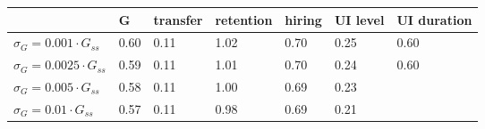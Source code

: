 \begin{tabular}{lllllll}
\toprule
 & \textbf{G} & \textbf{transfer} & \textbf{retention} & \textbf{hiring} & \textbf{UI level} & \textbf{UI duration} \\
\midrule
$\sigma_G = 0.001 \cdot G_{ss}$ & 0.60 & 0.11 & 1.02 & 0.70 & 0.25 & 0.60 \\
$\sigma_G = 0.0025 \cdot G_{ss}$ & 0.59 & 0.11 & 1.01 & 0.70 & 0.24 & 0.60 \\
$\sigma_G = 0.005 \cdot G_{ss}$ & 0.58 & 0.11 & 1.00 & 0.69 & 0.23 &  \\
$\sigma_G = 0.01 \cdot G_{ss}$ & 0.57 & 0.11 & 0.98 & 0.69 & 0.21 &  \\
\bottomrule
\end{tabular}
